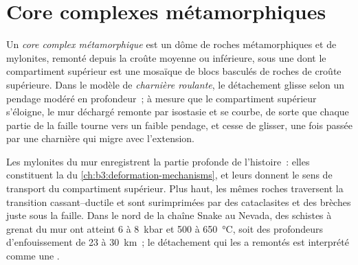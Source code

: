 \section{Core complexes métamorphiques}\label{sec:b3:extension-strike-slip:core}

\begin{definition}\label{def:b3:extension-strike-slip:core-complex}
Un \emph{core complex métamorphique} est un dôme de
roches métamorphiques et de mylonites, remonté depuis la croûte moyenne ou inférieure,
sous une  dont le compartiment supérieur est une mosaïque de blocs
basculés de roches de croûte supérieure. Dans le modèle de \emph{charnière roulante},
le détachement glisse selon un pendage modéré en profondeur~; à mesure que le compartiment
supérieur s'éloigne, le mur déchargé remonte par isostasie et se courbe, de sorte que chaque
partie de la faille tourne vers un faible pendage, et cesse de glisser, une fois passée par
une charnière qui migre avec l'extension.
\end{definition}

Les mylonites du mur enregistrent la partie profonde de l'histoire~: elles constituent la  du \cref{ch:b3:deformation-mechanisms}, et leurs  donnent le
sens de transport du compartiment supérieur. Plus haut, les mêmes roches traversent la
transition cassant--ductile et sont surimprimées par des
cataclasites et des brèches juste sous la faille. Dans le nord de la chaîne Snake
au Nevada, des schistes à grenat du mur ont atteint 6 à \qty{8}{kbar}
et 500 à \qty{650}{\celsius}, soit des profondeurs d'enfouissement de 23 à \qty{30}{km}~; le
détachement qui les a remontés est interprété comme une .

